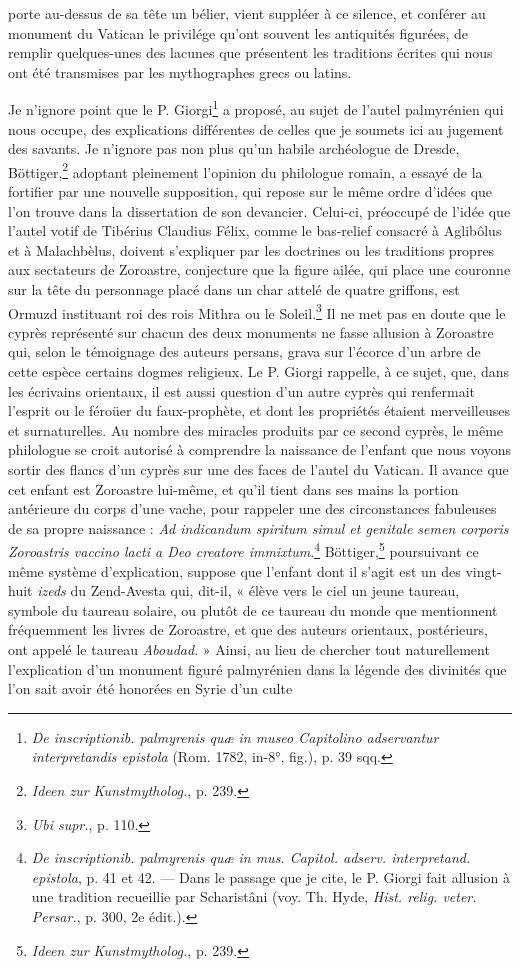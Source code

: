 \documentclass[a4paper, 11pt, oneside, polutonikogreek, french]{article}
\begin{document}
porte au-dessus de sa tête un bélier, vient suppléer à ce silence, et conférer au monument du Vatican le privilége qu'ont souvent les antiquités figurées, de remplir quelques-unes des lacunes que présentent les traditions écrites qui nous ont été transmises par les mythographes grecs ou latins.

Je n'ignore point que le P. Giorgi\footnote{\emph{De inscriptionib. palmyrenis quæ in museo Capitolino adservantur interpretandis epistola} (Rom. 1782, in-8°, fig.), p. 39 sqq.} a proposé, au sujet de l'autel palmyrénien qui nous occupe, des explications différentes de celles que je soumets ici au jugement des savants. Je n'ignore pas non plus qu'un habile archéologue de Dresde, Böttiger,\footnote{\emph{Ideen zur Kunstmytholog.}, p. 239.} adoptant pleinement l'opinion du philologue romain, a essayé de la fortifier par une nouvelle supposition, qui repose sur le même ordre d'idées que l'on trouve dans la dissertation de son devancier. Celui-ci, préoccupé de l'idée que l'autel votif de Tibérius Claudius Félix, comme le bas-relief consacré à Aglibôlus et à Malachbèlus, doivent s'expliquer par les doctrines ou les traditions propres aux sectateurs de Zoroastre, conjecture que la figure ailée, qui place une couronne sur la tête du personnage placé dans un char attelé de quatre griffons, est Ormuzd instituant roi des rois Mithra ou le Soleil.\footnote{\emph{Ubi supr.}, p. 110.} Il ne met pas en doute que le cyprès représenté sur chacun des deux monuments ne fasse allusion à Zoroastre qui, selon le témoignage des auteurs persans, grava sur l'écorce d'un arbre de cette espèce certains dogmes religieux. Le P. Giorgi rappelle, à ce sujet, que, dans les écrivains orientaux, il est aussi question d'un autre cyprès qui renfermait l'esprit ou le féroüer du faux-prophète, et dont les propriétés étaient merveilleuses et surnaturelles. Au nombre des miracles produits par ce second cyprès, le même philologue se croit autorisé à comprendre la naissance de l'enfant que nous voyons sortir des flancs d'un cyprès sur une des faces de l'autel du Vatican. Il avance que cet enfant est Zoroastre lui-même, et qu'il tient dans ses mains la portion antérieure du corps d'une vache, pour rappeler une des circonstances fabuleuses de sa propre naissance : \emph{Ad indicandum spiritum simul et genitale semen corporis Zoroastris vaccino lacti a Deo creatore immixtum}.\footnote{\emph{De inscriptionib. palmyrenis quæ in mus. Capitol. adserv. interpretand. epistola}, p. 41 et 42. --- Dans le passage que je cite, le P. Giorgi fait allusion à une tradition recueillie par Scharistâni (voy. Th. Hyde, \emph{Hist. relig. veter. Persar.}, p. 300, 2e édit.).} Böttiger,\footnote{\emph{Ideen zur Kunstmytholog.}, p. 239.} poursuivant ce même système d'explication, suppose que l'enfant dont il s'agit est un des vingt-huit \emph{izeds} du Zend-Avesta qui, dit-il, « élève vers le ciel un jeune taureau, symbole du taureau solaire, ou plutôt de ce taureau du monde que mentionnent fréquemment les livres de Zoroastre, et que des auteurs orientaux, postérieurs, ont appelé le taureau \emph{Aboudad}. » Ainsi, au lieu de chercher tout naturellement l'explication d'un monument figuré palmyrénien dans la légende des divinités que l'on sait avoir été honorées en Syrie d'un culte 
\end{document}
